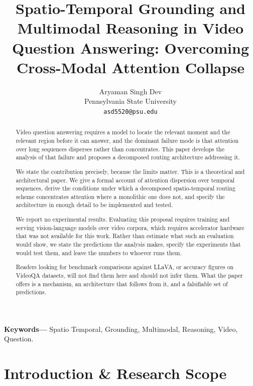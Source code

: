 \documentclass[10pt,journal,compsoc,twocolumn]{IEEEtran}
\begin{document}
\title{Spatio-Temporal Grounding and Multimodal Reasoning in Video Question Answering: Overcoming Cross-Modal Attention Collapse}

\author{
Aryaman Singh Dev\\
Pennsylvania State University \\
\texttt{asd5520@psu.edu}
}

\maketitle

\begin{abstract}
Video question answering requires a model to locate the relevant moment and the relevant region before it can answer, and the dominant failure mode is that attention over long sequences disperses rather than concentrates. This paper develops the analysis of that failure and proposes a decomposed routing architecture addressing it.

We state the contribution precisely, because the limits matter. This is a theoretical and architectural paper. We give a formal account of attention dispersion over temporal sequences, derive the conditions under which a decomposed spatio-temporal routing scheme concentrates attention where a monolithic one does not, and specify the architecture in enough detail to be implemented and tested.

We report no experimental results. Evaluating this proposal requires training and serving vision-language models over video corpora, which requires accelerator hardware that was not available for this work. Rather than estimate what such an evaluation would show, we state the predictions the analysis makes, specify the experiments that would test them, and leave the numbers to whoever runs them.

Readers looking for benchmark comparisons against LLaVA, or accuracy figures on VideoQA datasets, will not find them here and should not infer them. What the paper offers is a mechanism, an architecture that follows from it, and a falsifiable set of predictions.
\end{abstract}

\noindent\textbf{Keywords---} Spatio Temporal, Grounding, Multimodal, Reasoning, Video, Question.







\section{Introduction \& Research Scope}
\end{document}
